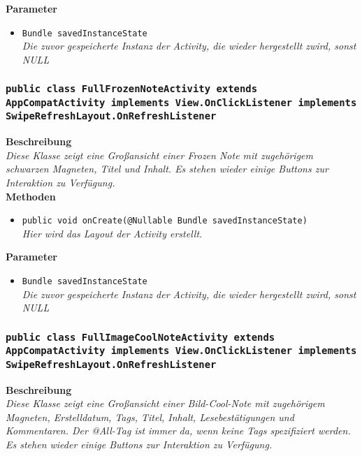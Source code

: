 	\textbf{Parameter}
	\begin{itemize}
		\item\texttt{Bundle savedInstanceState}\\ 
	\textit{Die zuvor gespeicherte Instanz der Activity, die wieder hergestellt zwird, sonst NULL}\\
	\end{itemize} 

\subsubsection{\texttt{public class FullFrozenNoteActivity extends AppCompatActivity implements View.OnClickListener implements SwipeRefreshLayout.OnRefreshListener}}

	\textbf{Beschreibung} \\
	\textit{Diese Klasse zeigt eine Großansicht einer Frozen Note mit zugehörigem schwarzen Magneten, Titel und Inhalt. Es stehen wieder einige Buttons zur Interaktion zu Verfügung.} \\

	\textbf{Methoden}
	\begin{itemize}
		\item\texttt{{public void onCreate(@Nullable Bundle savedInstanceState)}}\\
	\textit{Hier wird das Layout der Activity erstellt.}\\
	\end{itemize}

	\textbf{Parameter}
	\begin{itemize}
		\item\texttt{Bundle savedInstanceState}\\ 
	\textit{Die zuvor gespeicherte Instanz der Activity, die wieder hergestellt zwird, sonst NULL}\\
	\end{itemize} 

\subsubsection{\texttt{public class FullImageCoolNoteActivity extends AppCompatActivity implements View.OnClickListener implements SwipeRefreshLayout.OnRefreshListener}}

	\textbf{Beschreibung} \\
	\textit{Diese Klasse zeigt eine Großansicht einer Bild-Cool-Note mit zugehörigem Magneten, Erstelldatum, Tags, Titel, Inhalt, Lesebestätigungen und Kommentaren. Der @All-Tag ist immer da, wenn keine Tags spezifiziert werden. Es stehen wieder einige Buttons zur Interaktion zu Verfügung.} \\

